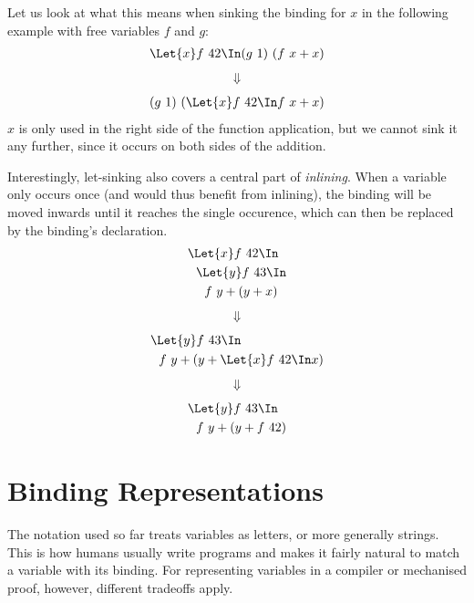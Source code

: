     Let us look at what this means when sinking the binding for $x$
    in the following example with free variables $f$ and $g$:
    \begin{align*}
      \Let{x} f\ 42 \In (g\ 1)\ (f\ x + x)
    \end{align*}
    \begin{align*}
      \Downarrow
    \end{align*}
    \begin{align*}
      (g\ 1)\ (\Let{x} f\ 42 \In f\ x + x)
    \end{align*}
    $x$ is only used in the right side of the function application,
    but we cannot sink it any further,
    since it occurs on both sides of the addition.

    Interestingly, let-sinking also covers a central part of \emph{inlining}.
    When a variable only occurs once (and would thus benefit from inlining),
    the binding will be moved inwards until it reaches the single occurence,
    which can then be replaced by the binding's declaration.
    \begin{align*}
      &\Let{x} f\ 42 \In          \\
      &\ \ \Let{y} f\ 43 \In      \\
      &\ \ \ \ f\ y + (y + x)
    \end{align*}
    \begin{align*}
      \Downarrow
    \end{align*}
    \begin{align*}
      &\Let{y} f\ 43 \In      \\
      &\ \ f\ y + (y + \Let{x} f\ 42 \In x)
    \end{align*}
    \begin{align*}
      \Downarrow
    \end{align*}
    \begin{align*}
      &\Let{y} f\ 43 \In      \\
      &\ \ f\ y + (y + f\ 42)
    \end{align*}

\section{Binding Representations}
\label{sec:binding-representations}
    The notation used so far treats variables as letters, or more generally strings.
    This is how humans usually write programs
    and makes it fairly natural to match a variable with its binding.
    For representing variables in a compiler or mechanised proof, however,
    different tradeoffs apply.

